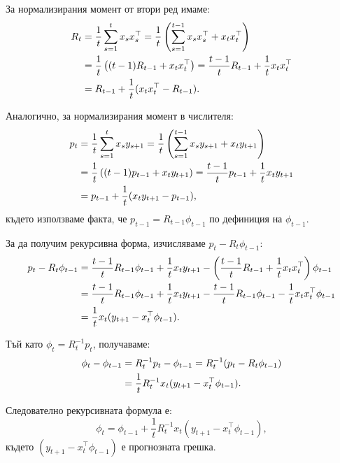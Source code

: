 За нормализирания момент от втори ред имаме:
\begin{align}
R_t &= \frac{1}{t}\sum_{s=1}^{t} x_{s} x_{s}^\top = \frac{1}{t}\left(\sum_{s=1}^{t-1} x_{s} x_{s}^\top + x_{t} x_{t}^\top\right) \notag \\
&= \frac{1}{t}\left((t-1)R_{t-1} + x_{t} x_{t}^\top\right) = \frac{t-1}{t}R_{t-1} + \frac{1}{t}x_{t} x_{t}^\top \notag \\
&= R_{t-1} + \frac{1}{t}(x_{t} x_{t}^\top - R_{t-1}).
\end{align}

Аналогично, за нормализирания момент в числителя:
\begin{align}
p_t &= \frac{1}{t}\sum_{s=1}^{t} x_{s} y_{s+1} = \frac{1}{t}\left(\sum_{s=1}^{t-1} x_{s} y_{s+1} + x_{t} y_{t+1}\right) \notag \\
&= \frac{1}{t}\left((t-1)p_{t-1} + x_{t} y_{t+1}\right) = \frac{t-1}{t}p_{t-1} + \frac{1}{t}x_{t} y_{t+1} \notag \\
&= p_{t-1} + \frac{1}{t}(x_{t} y_{t+1} - p_{t-1}),
\end{align}
където използваме факта, че $p_{t-1} = R_{t-1} {\phi}_{t-1}$ по дефиниция на ${\phi}_{t-1}$.

За да получим рекурсивна форма, изчисляваме $p_t - R_t \phi_{t-1}$:
\begin{align}
p_t - R_t\phi_{t-1} &= \frac{t-1}{t}R_{t-1}\phi_{t-1} + \frac{1}{t}x_t y_{t+1} - \left(\frac{t-1}{t}R_{t-1} + \frac{1}{t}x_t x_t^\top\right)\phi_{t-1} \notag \\
&= \frac{t-1}{t}R_{t-1}\phi_{t-1} + \frac{1}{t}x_t y_{t+1} - \frac{t-1}{t}R_{t-1}\phi_{t-1} - \frac{1}{t}x_t x_t^\top\phi_{t-1} \notag \\
&= \frac{1}{t}x_t(y_{t+1} - x_t^\top\phi_{t-1}).
\end{align}

Тъй като $\phi_t = R_t^{-1} p_t$, получаваме:
\begin{align}
\phi_t - \phi_{t-1} &= R_t^{-1}p_t - \phi_{t-1} = R_t^{-1}(p_t - R_t\phi_{t-1}) \notag \\
&= \frac{1}{t}R_t^{-1} x_t(y_{t+1} - x_t^\top\phi_{t-1}).
\end{align}

Следователно рекурсивната формула е:
\begin{equation}
{\phi}_t = {\phi}_{t-1} + \frac{1}{t}R_t^{-1} x_{t} (y_{t+1} - x_{t}^\top {\phi}_{t-1}),
\label{eq:rls_basic}
\end{equation}
където $(y_{t+1} - x_{t}^\top {\phi}_{t-1})$ е прогнозната грешка.

